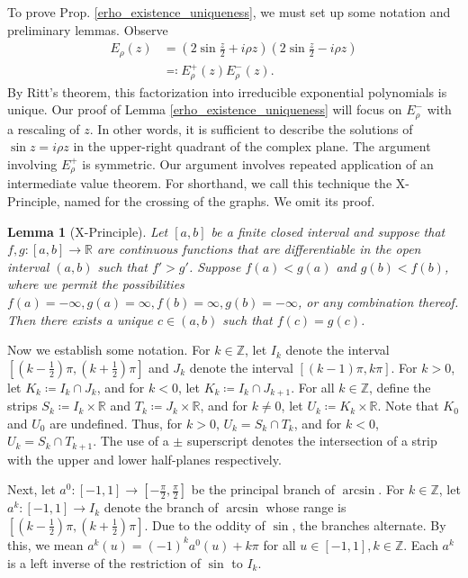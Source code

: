 \documentclass{amsart}
\theoremstyle{plain}
\numberwithin{theorem}{section}
\newtheorem{lemma}[theorem]{Lemma}
\theoremstyle{definition}
\theoremstyle{remark}
\theoremstyle{brakets}
\newcommand{\R}{\mathbb{R}}
\newcommand{\Z}{\mathbb{Z}}
\begin{document}
To prove Prop. \ref{erho_existence_uniqueness}, we must set up some notation and preliminary lemmas. Observe
\begin{align}
    E_\rho(z) &= \left(2\sin \frac{z}{2} +i\rho z\right) \left( 2\sin \frac{z}{2} - i \rho z \right) \label{erho_factored} \\ 
    &\eqqcolon E_\rho^+(z)E_\rho^-(z). \nonumber
\end{align}
\noindent By Ritt's theorem, this factorization into irreducible exponential polynomials is unique. Our proof of Lemma \ref{erho_existence_uniqueness} will focus on $E_\rho^-$ with a rescaling of $z$. In other words, it is sufficient to describe the solutions of $\sin z = i\rho z$ in the upper-right quadrant of the complex plane. The argument involving $E_\rho^+$ is symmetric. Our argument involves repeated application of an intermediate value theorem. For shorthand, we call this technique the X-Principle, named for the crossing of the graphs. We omit its proof.

\begin{lemma}[X-Principle]
\label{crossing}
Let $[a,b]$ be a finite closed interval and suppose that $f,g:[a,b] \to \R$ are continuous functions that are differentiable in the open interval $(a,b)$ such that $f' > g'$. Suppose $f(a) < g(a)$ and $g(b) < f(b)$, where we permit the possibilities $f(a) = -\infty, g(a) = \infty, f(b) = \infty, g(b) = -\infty$, or any combination thereof. Then there exists a unique  $c \in (a,b)$ such that $f(c) = g(c)$.
\end{lemma}

Now we establish some notation. For $k \in \Z$, let $I_k$ denote the interval $[(k-\frac{1}{2})\pi,(k+\frac{1}{2})\pi]$ and $J_k$ denote the interval $[(k-1)\pi,k\pi]$. For $k > 0$, let $K_k \coloneq I_k \cap J_k$, and for $k < 0$, let $K_k \coloneq I_k \cap J_{k+1}$. For all $k \in \Z$, define the strips $S_k \coloneq I_k \times \R$ and $T_k \coloneq J_k \times \R$, and for $k \neq 0$, let $U_k \coloneq K_k \times \R$. Note that $K_0$ and $U_0$ are undefined. Thus, for $k > 0$, $U_k = S_k \cap T_k$, and for $k < 0$, $U_k = S_k \cap T_{k+1}$. The use of a $\pm$ superscript denotes the intersection of a strip with the upper and lower half-planes respectively.

Next, let $a^0: [-1,1] \to [-\frac{\pi}{2},\frac{\pi}{2}]$ be the principal branch of $\arcsin$. For $k \in \Z$, let $a^k:[-1,1] \to I_k$ denote the branch of $\arcsin$ whose range is $[(k-\frac{1}{2})\pi,(k+\frac{1}{2})\pi]$. Due to the oddity of $\sin$, the branches alternate. By this, we mean $a^{k}(u) = (-1)^ka^0(u)+k\pi$ for all $u \in [-1,1], k \in \Z$. Each $a^k$ is a left inverse of the restriction of $\sin$ to $I_k$. 
\end{document}
